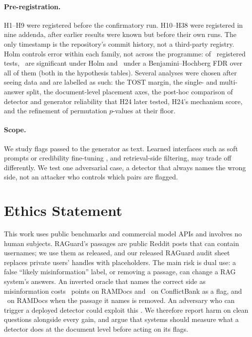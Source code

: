 \paragraph{Pre-registration.} H1--H9 were registered before the confirmatory run. H10--H38
were registered in nine addenda, after earlier results were known but before their own runs. The only
timestamp is the repository's commit history, not a third-party registry. Holm controls error within each family, not
across the programme: of \fdrN\ registered tests, \fdrHolm\ are significant under Holm and \fdrBH\ under a
Benjamini--Hochberg FDR over all of them (both in the hypothesis tables). Several analyses were chosen after
seeing data and are labelled as such: the TOST margin, the single- and multi-answer split, the document-level
placement axes, the post-hoc comparison of detector and generator reliability that H24 later tested, H24's mechanism
score, and the refinement of permutation $p$-values at their floor.

\paragraph{Scope.} We study flags passed to the generator as text. Learned interfaces such as soft prompts or
credibility fine-tuning \citep{ye2026tcr,pan2024credibility}, and retrieval-side filtering, may trade off differently. We test one adversarial case, a detector that always names the wrong side, not an attacker who controls
which pairs are flagged.

\section*{Ethics Statement}
This work uses public benchmarks and commercial model APIs and involves no human subjects. RAGuard's passages are
public Reddit posts that can contain usernames; we use them as released, and our released RAGuard audit sheet replaces private users' handles with placeholders. The main
risk is dual use: a false ``likely misinformation'' label, or removing a passage, can
change a RAG system's answers. An inverted oracle that names the correct side as misinformation costs \aadvDirConf\
points on RAMDocs and \azCbMiniOracleInvFlagDirectionalConflict\ on ConflictBank as a flag, and \aadvRemConf\ on
RAMDocs when the passage it names is removed. An adversary who can trigger a deployed detector could exploit this
\citep{zou2025poisonedrag}. We therefore report harm on clean questions alongside every gain, and argue that
systems should measure what a detector does at the document level before acting on its flags.
